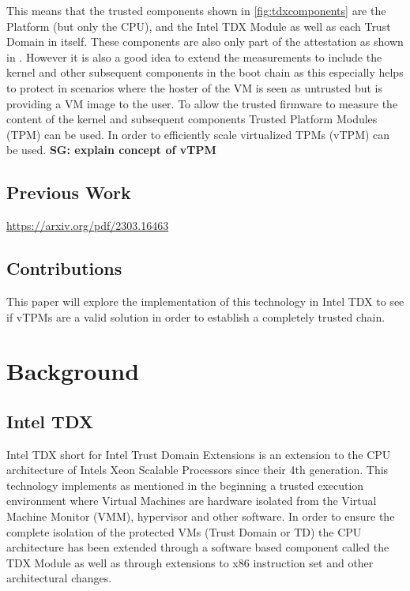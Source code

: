 \documentclass[sigplan,screen,nonacm]{acmart}
\newcommand{\sg}[1]{\textbf{SG: #1}}
\begin{document}
This means that the trusted components shown in \cref{fig:tdxcomponents} are the Platform (but only the CPU), and the Intel TDX Module as well as each Trust Domain in itself.
These components are also only part of the attestation as shown in \cite{CA-KVM}.
However it is also a good idea to extend the measurements to include the kernel and other subsequent components in the boot chain as this especially helps to protect in scenarios where the hoster of the VM is seen as untrusted but is providing a VM image to the user.
To allow the trusted firmware to measure the content of the kernel and subsequent components Trusted Platform Modules (TPM) can be used.
In order to efficiently scale virtualized TPMs (vTPM) can be used.
\sg{explain concept of vTPM}

\subsection{Previous Work}
\url{https://arxiv.org/pdf/2303.16463}

\subsection{Contributions}

This paper will explore the implementation of this technology in Intel TDX to see if vTPMs are a valid solution in order to establish a completely trusted chain.

\section{Background}

\subsection{Intel TDX}
Intel TDX short for Intel Trust Domain Extensions is an extension to the CPU architecture of Intels Xeon Scalable Processors since their 4th generation\cite{Intel-TDX-support}.
This technology implements as mentioned in the beginning a trusted execution environment where Virtual Machines are hardware isolated from the Virtual Machine Monitor (VMM), hypervisor and other software.
In order to ensure the complete isolation of the protected VMs (Trust Domain or TD) the CPU architecture has been extended through a software based component called the TDX Module as well as through extensions to x86 instruction set and other architectural changes.
\end{document}
